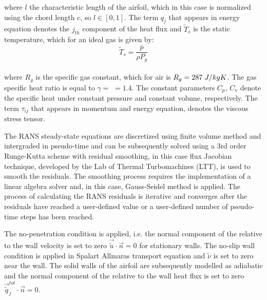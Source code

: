 \newpage


where $l$ the characteristic length of the airfoil, which in this 
case is normalized using the chord length $c$, so $l \!\in 
\![0,1]$. The term $q_{j}$ that appears in energy equation denotes
the $j_{th}$ component of the heat flux and $\tilde{T}_{s}$ is the 
static temperature, which for an ideal gas is given by:
\begin{equation}
\tilde{T}_{s} = \dfrac{\overline{p}}{ρΡ_{g}}
\end{equation}
\\[-2mm]
where $R_{g}$ is the specific gas constant, which for air is 
$R_{g} = 287 \hspace{1mm} J/kgK$. The gas specific heat ratio is 
equal to $γ =$  $= 1.4$. The constant parameters $C_{p}$,
$C_{\mathrm{v}}$ denote the specific heat under constant pressure 
and constant volume, respectively. The term $τ_{ij}$ that appears 
in momentum and energy equation, denotes the viscous stress tensor.

The RANS steady-state equations are discretized using finite volume 
method and intergraded in pseudo-time and can be subsequently 
solved using a 3rd order Runge-Kutta scheme with residual 
smoothing, in this case flux Jacobian technique, developed by the 
Lab of Thermal Turbomachines (LTT), is used to 
smooth the residuals. The smoothing process requires the 
implementation of a linear algebra solver and, in this case, 
Gauss-Seidel method is applied. The process of calculating the RANS 
residuals is iterative and converges after the residuals have 
reached a user-defined value or a user-defined number of 
pseudo-time steps has been reached.

The no-penetration condition is applied, i.e. the normal component 
of the relative to the wall velocity is set to zero 
$\vec{\tilde{u}} \cdot \vec{n} = 0$ for stationary walls. The 
no-slip wall condition is applied in Spalart Allmaras transport 
equation and $\tilde{ν}$ is set to zero near the wall. The solid 
walls of the airfoil are subsequently modelled as adiabatic and the 
normal component of the relative to the wall heat flux is set to 
zero $\vec{\tilde{q}}_{j}^{tot} \cdot \vec{n} = 0$.
 

